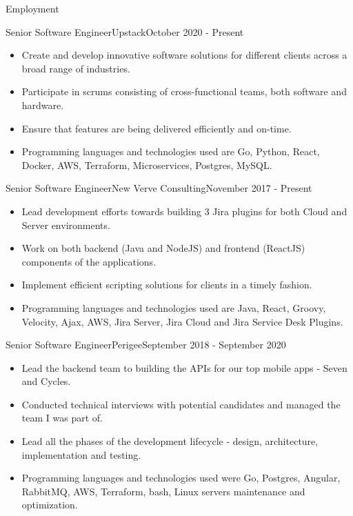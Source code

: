 \documentclass[]{cv}
\begin{document}
	\makeheader
	
	\begin{cvsection}{Employment}
		\begin{cvsubsection}{Senior Software Engineer}{Upstack}{October 2020 - Present }
			\begin{itemize}
				\item Create and develop innovative software solutions for different clients across a broad range of industries. 
				\item Participate in scrums consisting of cross-functional teams, both software and hardware. 
				\item Ensure that features are being delivered efficiently and on-time. 
				\item Programming languages and technologies used are Go, Python, React, Docker, AWS, Terraform, Microservices, Postgres, MySQL.
			\end{itemize}
		\end{cvsubsection}

		\begin{cvsubsection}{Senior Software Engineer}{New Verve Consulting}{November 2017 - Present }
			\begin{itemize}
				\item Lead development efforts towards building 3 Jira plugins for both Cloud and Server environments.
				\item Work on both backend (Java and NodeJS) and frontend (ReactJS) components of the applications.
				\item Implement efficient scripting solutions for clients in a timely fashion.
				\item Programming languages and technologies used are Java, React, Groovy, Velocity, Ajax, AWS, 
				Jira Server, Jira Cloud and Jira Service Desk Plugins.
			\end{itemize}
		\end{cvsubsection}

		\begin{cvsubsection}{Senior Software Engineer}{Perigee}{September 2018 - September 2020}
			\begin{itemize}
				\item Lead the backend team to building the APIs for our top mobile apps - Seven and Cycles.
				\item Conducted technical interviews with potential candidates and managed the team I was part of.
				\item Lead all the phases of the development lifecycle - design, architecture, implementation and testing.
				\item Programming languages and technologies used were Go, Postgres, Angular, RabbitMQ, AWS, Terraform, bash, Linux servers maintenance and optimization.
			\end{itemize}
		\end{cvsubsection}
		

\end{cvsection}
\end{document}
